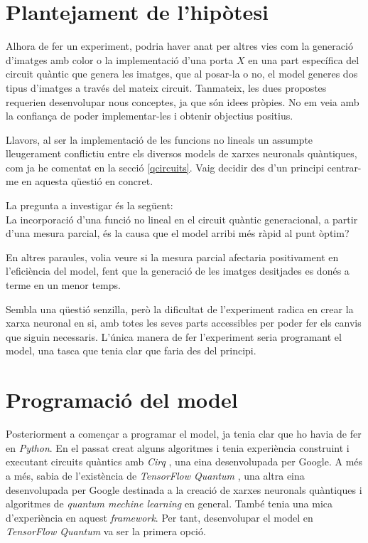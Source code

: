 \chapter{Plantejament de l'hipòtesi}

Alhora de fer un experiment, podria haver anat per altres vies com la generació d'imatges amb color o la implementació d'una porta $X$ en una part específica del circuit quàntic que genera les imatges, que al posar-la o no, el model generes dos tipus d'imatges a través del mateix circuit. Tanmateix, les dues propostes requerien desenvolupar nous conceptes, ja que són idees pròpies. No em veia amb la confiança de poder implementar-les i obtenir objectius positius.

Llavors, al ser la implementació de les funcions no lineals un assumpte lleugerament conflictiu entre els diversos models de xarxes neuronals quàntiques, com ja he comentat en la secció \ref{qcircuits}.  Vaig decidir des d'un principi centrar-me en aquesta qüestió en concret.

La pregunta a investigar és la següent: \\
La incorporació d'una funció no lineal en el circuit quàntic generacional, a partir d'una mesura parcial, és la causa que el model arribi més ràpid al punt òptim?

En altres paraules, volia veure si la mesura parcial afectaria positivament en l'eficiència del model, fent que la generació de les imatges desitjades es donés a terme en un menor temps.

Sembla una qüestió senzilla, però la dificultat de l'experiment radica en crear la xarxa neuronal en si, amb totes les seves parts accessibles per poder fer els canvis que siguin necessaris. L'única manera de fer l'experiment seria programant el model, una tasca que tenia clar que faria des del principi.

\chapter{Programació del model}

Posteriorment a començar a programar el model, ja tenia clar que ho havia de fer en \textit{Python}. En el passat creat alguns algoritmes i tenia experiència construint i executant circuits quàntics amb \textit{Cirq} \cite{cirq}, una eina desenvolupada per Google. A més a més, sabia de l'existència de \textit{TensorFlow Quantum} \cite{tfq}, una altra eina desenvolupada per Google destinada a la creació de xarxes neuronals quàntiques i algoritmes de \textit{quantum mechine learning} en general. També tenia una mica d'experiència en aquest \textit{framework}. Per tant, desenvolupar el model en \textit{TensorFlow Quantum} va ser la primera opció. 

